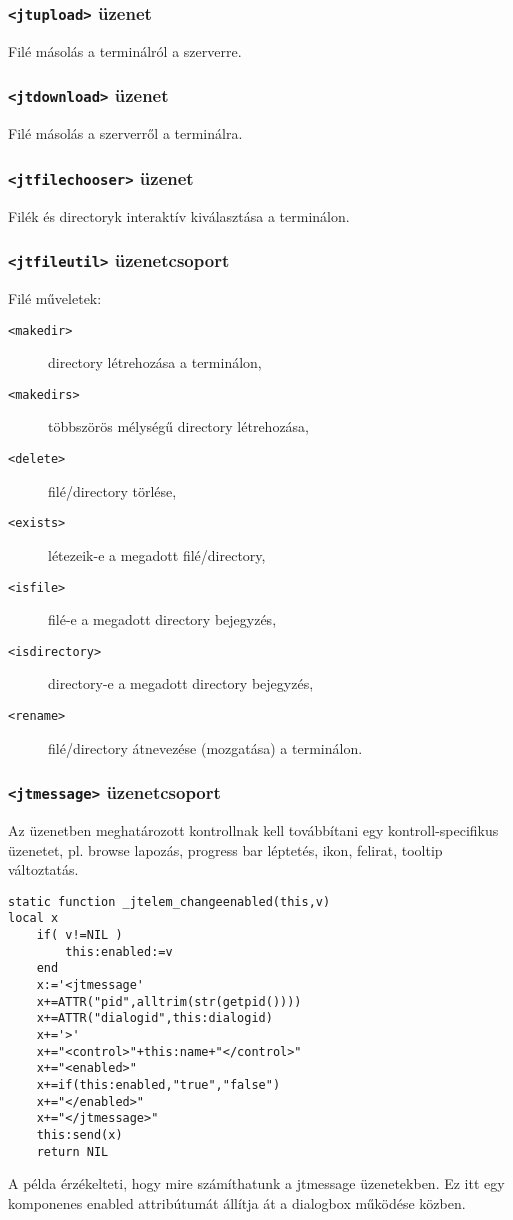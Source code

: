 \subsubsection{{\tt<jtupload>} üzenet}
Filé másolás a terminálról a szerverre.

\subsubsection{{\tt<jtdownload>} üzenet}
Filé másolás a szerverről a terminálra.
 
\subsubsection{{\tt<jtfilechooser>} üzenet}
Filék és directoryk interaktív kiválasztása a terminálon.

\subsubsection{{\tt<jtfileutil>} üzenetcsoport}
Filé műveletek:
\begin{description}
\item[{\tt<makedir>}] directory létrehozása a terminálon,
\item[{\tt<makedirs>}] többszörös mélységű directory létrehozása,
\item[{\tt<delete>}] filé/directory törlése,
\item[{\tt<exists>}] létezeik-e a megadott filé/directory,
\item[{\tt<isfile>}] filé-e a megadott directory bejegyzés,
\item[{\tt<isdirectory>}] directory-e a megadott directory bejegyzés, 
\item[{\tt<rename>}] filé/directory átnevezése (mozgatása) a terminálon.
\end{description}

\subsubsection{{\tt<jtmessage>} üzenetcsoport}
Az üzenetben meghatározott kontrollnak kell továbbítani 
egy kontroll-specifikus üzenetet, pl. browse lapozás, progress bar léptetés,
ikon, felirat, tooltip változtatás.
 
\begin{verbatim}
static function _jtelem_changeenabled(this,v)
local x
    if( v!=NIL )
        this:enabled:=v
    end
    x:='<jtmessage'
    x+=ATTR("pid",alltrim(str(getpid())))
    x+=ATTR("dialogid",this:dialogid)
    x+='>'
    x+="<control>"+this:name+"</control>"
    x+="<enabled>"
    x+=if(this:enabled,"true","false")
    x+="</enabled>"
    x+="</jtmessage>"
    this:send(x)
    return NIL
\end{verbatim}
    
A példa érzékelteti, hogy mire számíthatunk a jtmessage
üzenetekben. Ez itt egy komponenes enabled attribútumát állítja át
a dialogbox működése közben.
    
 